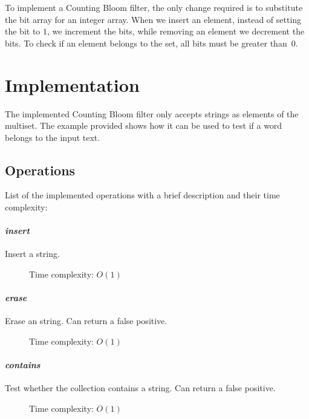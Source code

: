\documentclass{article}
\begin{document}
To implement a Counting Bloom filter, the only change required is to substitute the bit array for an integer array. When we insert an element, instead of setting the bit to $1$, we increment the bits, while removing an element we decrement the bits. To check if an element belongs to the set, all bits must be greater than~$0$.

\section*{Implementation}
The implemented Counting Bloom filter only accepts strings as elements of the multiset. The example provided shows how it can be used to test if a word belongs to the input text.

\subsection*{Operations}
List of the implemented operations with a brief description and their time complexity:

\paragraph*{\textit{insert}} Insert a string.
\begin{description}
\item[] Time complexity: $O(1)$
\end{description}

\paragraph*{\textit{erase}} Erase an string. Can return a false positive.
\begin{description}
\item[] Time complexity: $O(1)$
\end{description}

\paragraph*{\textit{contains}} Test whether the collection contains a string. Can return a false positive.
\begin{description}
\item[] Time complexity: $O(1)$
\end{description}



\end{document}

